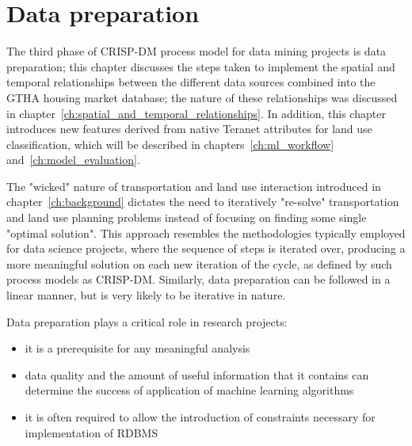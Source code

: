 \chapter{Data preparation} \label{ch:data_preparation}

The third phase of CRISP-DM process model for data mining projects is data preparation;
this chapter discusses the steps taken to implement the spatial and temporal relationships between the different data sources combined into the GTHA housing market database;
the nature of these relationships was discussed in chapter~\ref{ch:spatial_and_temporal_relationships}.
In addition, this chapter introduces new features derived from native Teranet attributes for land use classification, which will be described in chapters~\ref{ch:ml_workflow} and~\ref{ch:model_evaluation}.

The "wicked" nature of transportation and land use interaction introduced in chapter~\ref{ch:background} dictates the need to iteratively "re-solve" transportation and land use planning problems instead of focusing on finding some single "optimal solution".
This approach resembles the methodologies typically employed for data science projects, where the sequence of steps is iterated over, producing a more meaningful solution on each new iteration of the cycle, as defined by such process models as CRISP-DM\cite{Shearer2000}.
Similarly, data preparation can be followed in a linear manner, but is very likely to be iterative in nature\cite{Brownlee2013}.

\vspace{5mm}

Data preparation plays a critical role in research projects:

\begin{itemize}
    \item it is a prerequisite for any meaningful analysis
    \item data quality and the amount of useful information that it contains can determine the success of application of machine learning algorithms\cite{RaschkaMirjalili2017}
    \item it is often required to allow the introduction of constraints necessary for implementation of RDBMS
\end{itemize}

\vspace{5mm}

